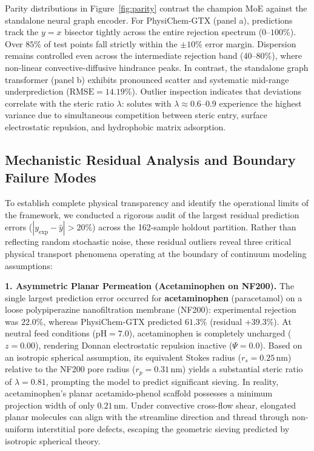 \documentclass[11pt]{article}
\begin{document}
Parity distributions in Figure~\ref{fig:parity} contrast the champion MoE against the standalone neural graph encoder. For PhysiChem-GTX (panel a), predictions track the $y=x$ bisector tightly across the entire rejection spectrum ($0\text{--}100\%$). Over $85\%$ of test points fall strictly within the $\pm 10\%$ error margin. Dispersion remains controlled even across the intermediate rejection band ($40\text{--}80\%$), where non-linear convective-diffusive hindrance peaks. In contrast, the standalone graph transformer (panel b) exhibits pronounced scatter and systematic mid-range underprediction ($\mathrm{RMSE} = 14.19\%$). Outlier inspection indicates that deviations correlate with the steric ratio $\lambda$: solutes with $\lambda \approx 0.6\text{--}0.9$ experience the highest variance due to simultaneous competition between steric entry, surface electrostatic repulsion, and hydrophobic matrix adsorption.

\subsection{Mechanistic Residual Analysis and Boundary Failure Modes}
\label{subsec:outliers}

To establish complete physical transparency and identify the operational limits of the framework, we conducted a rigorous audit of the largest residual prediction errors ($|y_{\mathrm{exp}} - \hat{y}| > 20\%$) across the 162-sample holdout partition. Rather than reflecting random stochastic noise, these residual outliers reveal three critical physical transport phenomena operating at the boundary of continuum modeling assumptions:

\textbf{1. Asymmetric Planar Permeation (Acetaminophen on NF200).} The single largest prediction error occurred for \textbf{acetaminophen} (paracetamol) on a loose polypiperazine nanofiltration membrane (NF200): experimental rejection was $22.0\%$, whereas PhysiChem-GTX predicted $61.3\%$ (residual $+39.3\%$). At neutral feed conditions ($\mathrm{pH} = 7.0$), acetaminophen is completely uncharged ($z = 0.00$), rendering Donnan electrostatic repulsion inactive ($\Psi = 0.0$). Based on an isotropic spherical assumption, its equivalent Stokes radius ($r_s = 0.25\,\mathrm{nm}$) relative to the NF200 pore radius ($r_p = 0.31\,\mathrm{nm}$) yields a substantial steric ratio of $\lambda = 0.81$, prompting the model to predict significant sieving. In reality, acetaminophen's planar acetamido-phenol scaffold possesses a minimum projection width of only $0.21\,\mathrm{nm}$. Under convective cross-flow shear, elongated planar molecules can align with the streamline direction and thread through non-uniform interstitial pore defects, escaping the geometric sieving predicted by isotropic spherical theory.
\end{document}
